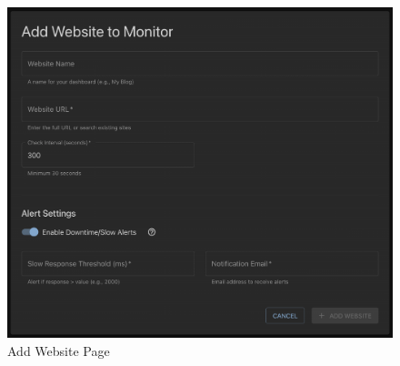 \begin{figure}
    \centering
    \includegraphics[width=1\linewidth]{figures/final_application/final_addwebsite_page.png}
    \caption{Add Website Page}
    \label{fig:app_addwebsite}
\end{figure}